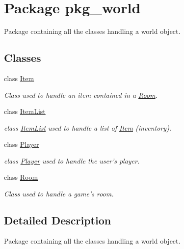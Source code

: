 \hypertarget{namespacepkg__world}{\section{Package pkg\-\_\-world}
\label{namespacepkg__world}
}


Package containing all the classes handling a world object.  


\subsection*{Classes}
\begin{DoxyCompactItemize}
\item 
class \hyperlink{classpkg__world_1_1Item}{Item}
\begin{DoxyCompactList}\small\item\em Class used to handle an item contained in a \hyperlink{classpkg__world_1_1Room}{Room}. \end{DoxyCompactList}\item 
class \hyperlink{classpkg__world_1_1ItemList}{Item\-List}
\begin{DoxyCompactList}\small\item\em class \hyperlink{classpkg__world_1_1ItemList}{Item\-List} used to handle a list of \hyperlink{classpkg__world_1_1Item}{Item} (inventory). \end{DoxyCompactList}\item 
class \hyperlink{classpkg__world_1_1Player}{Player}
\begin{DoxyCompactList}\small\item\em class \hyperlink{classpkg__world_1_1Player}{Player} used to handle the user's player. \end{DoxyCompactList}\item 
class \hyperlink{classpkg__world_1_1Room}{Room}
\begin{DoxyCompactList}\small\item\em Class used to handle a game's room. \end{DoxyCompactList}\end{DoxyCompactItemize}


\subsection{Detailed Description}
Package containing all the classes handling a world object. 